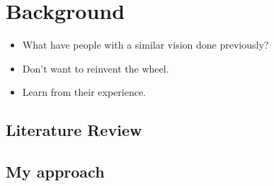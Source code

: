\chapter{Background}
\label{chap:background}

\begin{itemize}
  \item What have people with a similar vision done previously?
  \item Don't want to reinvent the wheel.
  \item Learn from their experience.
\end{itemize}

\section{Literature Review}

\section{My approach}

